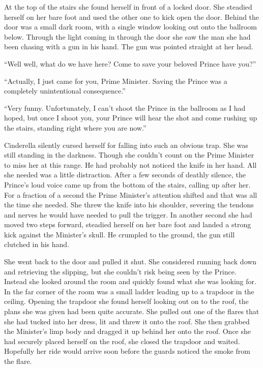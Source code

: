 \documentclass[11pt,letterpaper]{article}
\begin{document}
At the top of the stairs she found herself in front of a locked door. She steadied herself on her bare foot and used the other one to kick open the door. Behind the door was a small dark room, with a single window looking out onto the ballroom below. Through the light coming in through the door she saw the man she had been chasing with a gun in his hand. The gun was pointed straight at her head.

``Well well, what do we have here? Come to save your beloved Prince have you?''

``Actually, I just came for you, Prime Minister. Saving the Prince was a completely unintentional consequence.''

``Very funny. Unfortunately, I can't shoot the Prince in the ballroom as I had hoped, but once I shoot you, your Prince will hear the shot and come rushing up the stairs, standing right where you are now.''

Cinderella silently cursed herself for falling into such an obvious trap. She was still standing in the darkness. Though she couldn't count on the Prime Minister to miss her at this range. He had probably not noticed the knife in her hand. All she needed was a little distraction. After a few seconds of deathly silence, the Prince's loud voice came up from the bottom of the stairs, calling up after her. For a fraction of a second the Prime Minister's attention shifted and that was all the time she needed. She threw the knife into his shoulder, severing the tendons and nerves he would have needed to pull the trigger. In another second she had moved two steps forward, steadied herself on her bare foot and landed a strong kick against the Minister's skull. He crumpled to the ground, the gun still clutched in his hand.

She went back to the door and pulled it shut. She considered running back down and retrieving the slipping, but she couldn't risk being seen by the Prince. Instead she looked around the room and quickly found what she was looking for. In the far corner of the room was a small ladder leading up to a trapdoor in the ceiling. Opening the trapdoor she found herself looking out on to the roof, the plans she was given had been quite accurate. She pulled out one of the flares that she had tucked into her dress, lit and threw it onto the roof. She then grabbed the Minister's limp body and dragged it up behind her onto the roof. Once she had securely placed herself on the roof, she closed the trapdoor and waited. Hopefully her ride would arrive soon before the guards noticed the smoke from the flare.
\end{document}
